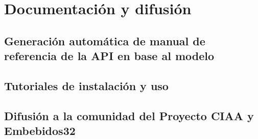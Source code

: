 \section{Documentación y difusión}
\label{sec:documentation}


\subsection{Generación automática de manual de referencia de la API en base al modelo}



\subsection{Tutoriales de instalación y uso}



\subsection{Difusión a la comunidad del Proyecto CIAA y Embebidos32}
